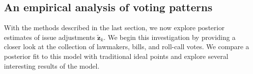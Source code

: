 


\subsection{An empirical analysis of voting patterns}
\label{section:empirical_analysis}

With the methods described in the last section, we now explore
posterior estimates of issue adjustments $\bm \tilde z_k$.
We begin this investigation by providing a closer look at the
collection of lawmakers, bills, and roll-call votes.  We compare
a posterior fit to this model with traditional ideal points and
explore several interesting results of the model.



